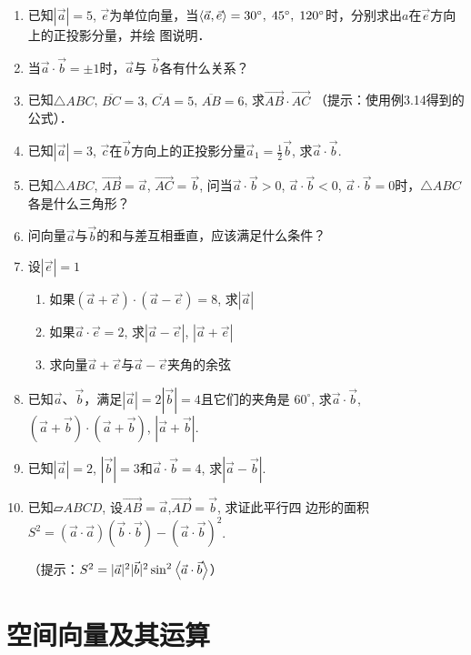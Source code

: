 \begin{enumerate}
    \item  已知$|\vec{a}|=5$, $\vec{e}$为单位向量，当$\left\langle \vec{a},\vec{e} \right\rangle=30^{\circ},\; 45^{\circ},\; 120^{\circ}$时，分别求出$a$在$\vec{e}$方向上的正投影分量，并绘
    图说明．
    \item  当$\vec{a}\cdot \vec{b}=\pm 1$时，$\vec{a}$与
    $\vec{b}$各有什么关系？
    \item  已知$\triangle ABC$, $\overline{BC}=3$, $\overline{CA}=5$, $\overline{AB}=6$, 求$\Vec{A B}\cdot \Vec{AC}$
    （提示：使用例3.14得到的公式）．
    \item  已知$|\vec{a}|=3$, $\vec{c}$在$\vec{b}$方向上的正投影分量$\vec{a}_1=\frac{1}{2}\vec{b}$,
    求$\vec{a}\cdot \vec{b}$.
    \item  已知$\triangle ABC$, $\Vec{AB}=\vec{a}$, $\Vec{AC}=\vec{b}$, 问当$\vec{a}\cdot \vec{b}>0$, $\vec{a}\cdot \vec{b}<0$, $\vec{a}\cdot \vec{b}=0$时，$\triangle ABC$各是什么三角形？

    \item  问向量$\vec{a}$与$\vec{b}$的和与差互相垂直，应该满足什么条件？
    \item  设$|\vec{e}|=1$
\begin{enumerate}
    \item 如果$(\vec{a}+\vec{e})\cdot (\vec{a}-\vec{e})=8$, 求$|\vec{a}|$
    \item 如果$\vec{a}\cdot \vec{e}=2$, 求$|\vec{a}-\vec{e}|$, $|\vec{a}+\vec{e}|$
    \item 求向量$\vec{a}+\vec{e}$与$\vec{a}-\vec{e}$夹角的余弦
\end{enumerate}

    \item  已知$\vec{a}$、$\vec{b}$，满足$|\vec{a}|=2|\vec{b}|=4$且它们的夹角是
    $60^{\circ}$, 求$\vec{a}\cdot \vec{b}$, $(\vec{a}+\vec{b})\cdot (\vec{a}+\vec{b})$, $|\vec{a}+\vec{b}|$.
    \item  已知$|\vec{a}|=2$, $|\vec{b}|=3$和$\vec{a}\cdot\vec{b}=4$, 求$|\vec{a}-\vec{b}|$.
    \item  已知$\parallelogram ABCD$, 设$\Vec{AB}=\vec{a}$,$\Vec{AD}=\vec{b}$, 求证此平行四
    边形的面积 $S^2=(\vec{a}\cdot \vec{a})(\vec{b}\cdot \vec{b})-(\vec{a}\cdot \vec{b})^2$.

    （提示：$S^2=|\vec{a}|^2|\vec{b}|^2\sin^2 \left\langle \vec{a}\cdot \vec{b} \right\rangle$）
\end{enumerate}

\section{空间向量及其运算}
